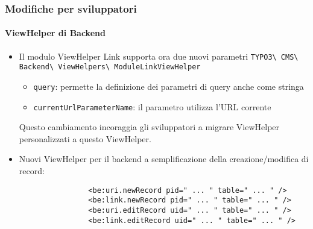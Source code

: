 \begin{frame}[fragile]
	\frametitle{Modifiche per sviluppatori}
	\framesubtitle{ViewHelper di Backend}


	\begin{itemize}
		\item Il modulo ViewHelper Link supporta ora due nuovi parametri\newline
			\small
				\texttt{TYPO3\textbackslash
					CMS\textbackslash
					Backend\textbackslash
					ViewHelpers\textbackslash
					ModuleLinkViewHelper}
			\normalsize

			\begin{itemize}
				\small
				\item \texttt{query}: permette la definizione dei parametri di query anche come stringa
				\item \texttt{currentUrlParameterName}: il parametro utilizza l'URL corrente
			\end{itemize}

			Questo cambiamento incoraggia gli sviluppatori a migrare ViewHelper personalizzati
			a questo ViewHelper.

		\item Nuovi ViewHelper per il backend a semplificazione della creazione/modifica di record:

			\begin{lstlisting}
				<be:uri.newRecord pid=" ... " table=" ... " />
				<be:link.newRecord pid=" ... " table=" ... " />
				<be:uri.editRecord uid=" ... " table=" ... " />
				<be:link.editRecord uid=" ... " table=" ... " />
			\end{lstlisting}

	\end{itemize}

\end{frame}


